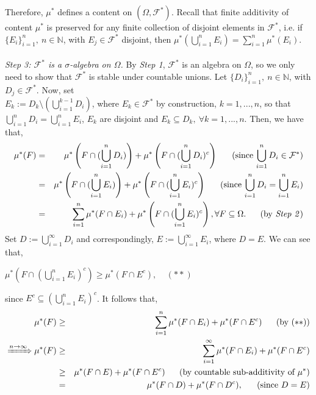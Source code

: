 \documentclass{article}
\begin{document}
Therefore, $\mu^{*}$ defines a content on $(\Omega, \mathcal{F}^{*})$. Recall that finite additivity of content $\mu^{*}$ is preserved for any finite collection of disjoint elements in $\mathcal{F}^{*}$, i.e. if $\{E_i\}_{i=1}^{n}, \ n \in \mathbb{N}$, with $E_j \in \mathcal{F}^{*}$ disjoint, then $\mu^{*}(\bigcup_{i=1}^{n}E_i) = \sum_{i=1}^{n}\mu^{*}(E_i)$.\\\\
\textit{Step 3: $\mathcal{F}^{*}$ is a $\sigma$-algebra on $\Omega$.} By \textit{Step 1}, $\mathcal{F}^{*}$ is an algebra on $\Omega$, so we only need to show that  $\mathcal{F}^{*}$ is stable under countable unions. Let $\{D_i\}_{i=1}^{n}, \ n \in \mathbb{N}$, with $D_j \in \mathcal{F}^{*}$. Now, set \\ $E_k := D_k \setminus (\bigcup_{i=1}^{k-1}D_i)$, where $E_k \in \mathcal{F}^{*}$ by construction, $k = 1,...,n$, so that $\bigcup_{i=1}^{n}D_i = \bigcup_{i=1}^{n}E_i$, $E_k$ are disjoint and $E_k \subseteq D_k, \ \forall k = 1, ..., n$. Then, we have that,
\begin{eqnarray}
\nonumber
\mu^{*}(F) &=& \mu^{*}\left(F \cap (\bigcup_{i=1}^{n}D_i)\right) + \mu^{*}\left(F \cap (\bigcup_{i=1}^{n}D_i)^c\right) \ \ \ \ \ \text{(since $\bigcup_{i=1}^{n}D_i \in \mathcal{F}^{*}$)}\\
\nonumber
&=& \mu^{*}\left(F \cap (\bigcup_{i=1}^{n}E_i)\right) + \mu^{*}\left(F \cap (\bigcup_{i=1}^{n}E_i)^c\right) \ \ \ \ \ \text{(since $\bigcup_{i=1}^{n}D_i = \bigcup_{i=1}^{n}E_i$)}\\
\nonumber
&=& \sum_{i=1}^{n}\mu^{*}(F \cap E_i) + \mu^{*}\left(F \cap (\bigcup_{i=1}^{n}E_i)^c\right), \forall F \subseteq \Omega. \ \ \ \ \ \text{(by \textit{Step 2})}
\end{eqnarray}
Set $D := \bigcup_{i=1}^{\infty}D_i$ and correspondingly, $E := \bigcup_{i=1}^{\infty}E_i$, where $D = E$. We can see that,
\begin{center}
	$\mu^{*}(F \cap (\bigcup_{i=1}^{n}E_i)^c) \geq \mu^{*}(F \cap E^c), \ \ \ \ \ \text{$(**)$}$
\end{center}
since $E^c \subseteq (\bigcup_{i=1}^{n}E_i)^c$. It follows that,
\begin{eqnarray}
\nonumber
\mu^{*}(F) &\geq& \sum_{i=1}^{n}\mu^{*}(F \cap E_i) + \mu^{*}(F \cap E^c) \ \ \ \ \ \text{(by $(**)$)}\\
\nonumber
\xRightarrow{n \to \infty} \mu^{*}(F) &\geq& \sum_{i=1}^{\infty}\mu^{*}(F \cap E_i) + \mu^{*}(F \cap E^c)\\
\nonumber
&\geq& \mu^{*}(F \cap E) + \mu^{*}(F \cap E^c) \ \ \ \ \ \text{(by countable sub-additivity of $\mu^{*}$)}\\
\nonumber
&=& \mu^{*}(F \cap D) + \mu^{*}(F \cap D^c), \ \ \ \ \ \text{(since $D = E$)}
\end{eqnarray}
\end{document}

